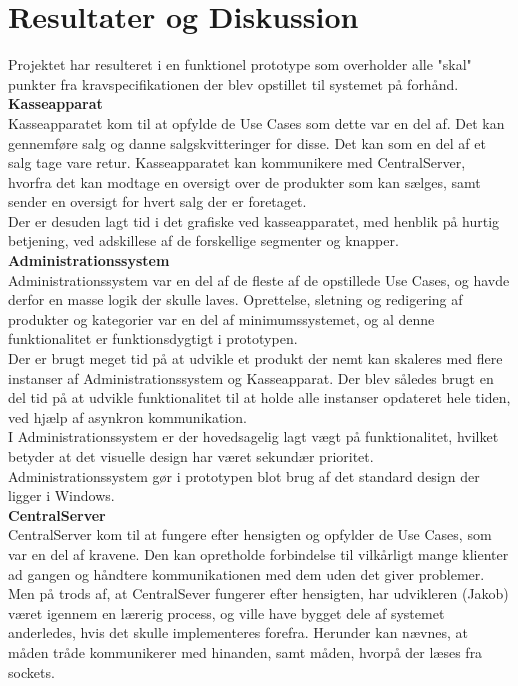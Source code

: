 \section{Resultater og Diskussion}
Projektet har resulteret i en funktionel prototype som overholder alle "skal" punkter fra kravspecifikationen der blev opstillet til systemet på forhånd.\\

\textbf{Kasseapparat}\\
Kasseapparatet kom til at opfylde de Use Cases som dette var en del af. Det kan gennemføre salg og danne salgskvitteringer for disse. Det kan som en del af et salg tage vare retur. Kasseapparatet kan kommunikere med CentralServer, hvorfra det kan modtage en oversigt over de produkter som kan sælges, samt sender en oversigt for hvert salg der er foretaget.\\
Der er desuden lagt tid i det grafiske ved kasseapparatet, med henblik på hurtig betjening, ved adskillese af de forskellige segmenter og knapper.\\

\textbf{Administrationssystem}\\
Administrationssystem var en del af de fleste af de opstillede Use Cases, og havde derfor en masse logik der skulle laves. Oprettelse, sletning og redigering af produkter og kategorier var en del af minimumssystemet, og al denne funktionalitet er funktionsdygtigt i prototypen.\\
Der er brugt meget tid på at udvikle et produkt der nemt kan skaleres med flere instanser af Administrationssystem og Kasseapparat. Der blev således brugt en del tid på at udvikle funktionalitet til at holde alle instanser opdateret hele tiden, ved hjælp af asynkron kommunikation.\\
I Administrationssystem er der hovedsagelig lagt vægt på funktionalitet, hvilket betyder at det visuelle design har været sekundær prioritet. Administrationssystem gør i prototypen blot brug af det standard design der ligger i Windows.\\

\textbf{CentralServer}\\
CentralServer kom til at fungere efter hensigten og opfylder de Use Cases, som var en del af kravene. Den kan opretholde forbindelse til vilkårligt mange klienter ad gangen og håndtere kommunikationen med dem uden det giver problemer.\\

Men på trods af, at CentralSever fungerer efter hensigten, har udvikleren (Jakob) været igennem en lærerig process, og ville have bygget dele af systemet anderledes, hvis det skulle implementeres forefra. Herunder kan nævnes, at måden tråde kommunikerer med hinanden, samt måden, hvorpå der læses fra sockets.\\

